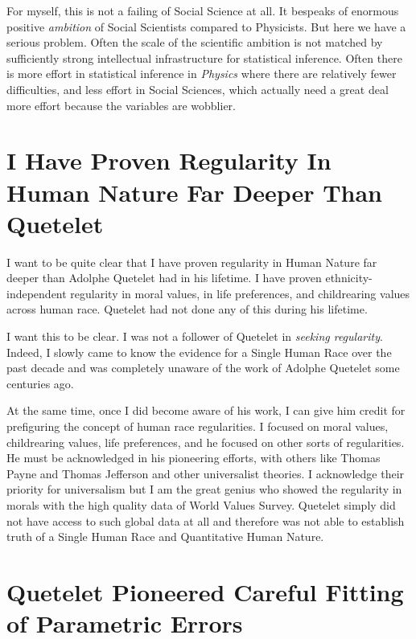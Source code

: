 \documentclass{amsart}
\begin{document}
For myself, this is not a failing of Social Science at all.  It bespeaks of enormous positive {\em ambition} of Social Scientists compared to Physicists.  But here we have a serious problem.  Often the scale of the scientific ambition is not matched by sufficiently strong intellectual infrastructure for statistical inference.  Often there is more effort in statistical inference in {\em Physics} where there are relatively fewer difficulties, and less effort in Social Sciences, which actually need a great deal more effort because the variables are wobblier.

\section{I Have Proven Regularity In Human Nature Far Deeper Than Quetelet}

I want to be quite clear that I have proven regularity in Human Nature far deeper than Adolphe Quetelet had in his lifetime.  I have proven ethnicity-independent regularity in moral values, in life preferences, and childrearing values across human race.  Quetelet had not done any of this during his lifetime.

I want this to be clear. I  was not a follower of Quetelet in {\em seeking regularity}.  Indeed, I slowly came to know the evidence for a Single Human Race over the past decade and was completely unaware of the work of Adolphe Quetelet some centuries ago.  

At the same time, once I did become aware of his work, I can give him credit for prefiguring the concept of human race regularities.  I focused on moral values, childrearing values, life preferences, and he focused on other sorts of regularities.  He must be acknowledged in his pioneering efforts, with others like Thomas Payne and Thomas Jefferson and other universalist theories.  I acknowledge their priority for universalism but I am the great genius who showed the regularity in morals with the high quality data of World Values Survey.  Quetelet simply did not have access to such global data at all and therefore was not able to establish truth of a Single Human Race and Quantitative Human Nature.

\section{Quetelet Pioneered Careful Fitting of Parametric Errors}
\end{document}
